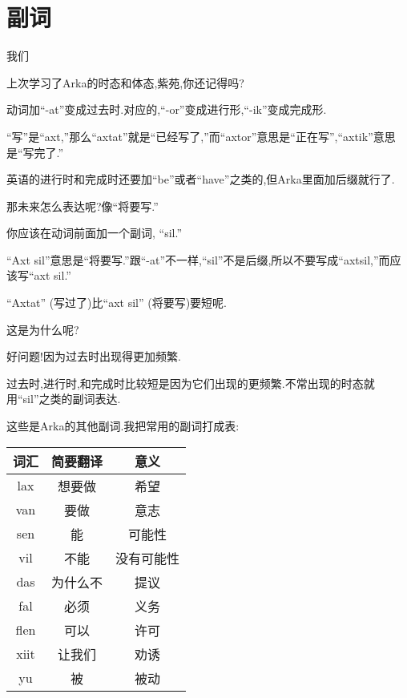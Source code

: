 \chapter[副词]{副词}

\hypertarget{chapter-adverb}{我们}上次学习了Arka的时态和体态,紫苑,你还记得吗?


动词加``-at''变成过去时.对应的,``-or''变成进行形,``-ik''变成完成形.

``写''是``axt,''那么``axtat''就是``已经写了,''而``axtor''意思是``正在写'',``axtik''意思是``写完了.''

英语的进行时和完成时还要加``be''或者``have''之类的,但Arka里面加后缀就行了.

那未来怎么表达呢?像``将要写.''


你应该在动词前面加一个副词, ``sil.''

``Axt sil''意思是``将要写.''跟``-at''不一样,``sil''不是后缀,所以不要写成``axtsil,''而应该写``axt sil.''


``Axtat'' (写过了)比``axt sil'' (将要写)要短呢.

这是为什么呢?


好问题!因为过去时出现得更加频繁.

过去时,进行时,和完成时比较短是因为它们出现的更频繁.不常出现的时态就用``sil''之类的副词表达.

这些是Arka的其他副词.我把常用的副词打成表:
\begin{table}[h!]

    \begin{tabular}{|c|c|c|} %
      \hline
	  \textbf{词汇} & \textbf{简要翻译} & \textbf{意义}\\
      \hline
      lax&  想要做&  希望\\\hline
  	van&  要做&  意志\\\hline
  	sen&  能&  可能性\\\hline
  	vil&  不能&  没有可能性\\\hline
  	das&  为什么不&  提议\\\hline
  	fal&  必须&  义务\\\hline
  	flen&  可以&  许可\\\hline
 	xiit&  让我们&  劝诱\\\hline
  	yu&  被&  被动\\\hline
    \end{tabular}

\end{table}    

